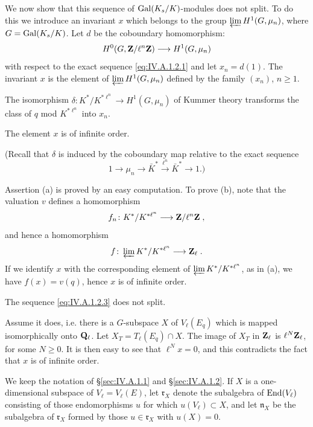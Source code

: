 We now show that this sequence of $\mathrm{Gal}(K_s/K)$-modules does not split.
To do this we introduce an invariant $x$ which belongs to the group
$\varprojlim H^1(G,\mu_n)$, where $G=\mathrm{Gal}(K_s/K)$. Let $d$ be the
coboundary homomorphism:
\[
H^0(G,\mathbf{Z}/\ell^n\mathbf{Z}) \longrightarrow H^1(G,\mu_n)
\]
with respect to the exact sequence \eqref{eq:IV.A.1.2.1} and let
$x_n=d(1)$. The invariant $x$ is the element of
$\varprojlim H^1(G,\mu_n)$ defined by the family $(x_n)$, $n\geq 1$.

\begin{proposition}
\begin{alist}
\item The isomorphism
$\delta\colon K^*/K^{*\ell^n}\longrightarrow H^1(G,\mu_n)$ of Kummer
theory transforms the class of $q$ mod $K^{*\ell^n}$ into $x_n$.
\item The element $x$ is of infinite order.
\end{alist}
\end{proposition}

(Recall that $\delta$ is induced by the coboundary map relative to the
exact sequence
\[
1 \longrightarrow \mu_n \longrightarrow \bar{K}^*
  \xrightarrow{\ \ell^n\ } \bar{K}^* \longrightarrow 1.)
\]

Assertion (a) is proved by an easy computation. To prove (b), note that
the valuation $v$ defines a homomorphism
\[
f_n\colon K^*/K^{*\ell^n} \longrightarrow \mathbf{Z}/\ell^n\mathbf{Z}\;,
\]
and hence a homomorphism
\[
f\colon \varprojlim K^*/K^{*\ell^n} \longrightarrow \mathbf{Z}_\ell\;.
\]
If we identify $x$ with the corresponding element of
$\varprojlim K^*/K^{*\ell^n}$, as in (a), we have $f(x)=v(q)$, hence $x$
is of infinite order.

\begin{corollary}
The sequence \eqref{eq:IV.A.1.2.3} does not split.
\end{corollary}

Assume it does, i.e. there is a $G$-subspace $X$ of $V_\ell(E_q)$ which
is mapped isomorphically onto $\mathbf{Q}_\ell$. Let $X_T = T_\ell(E_q)\cap X$.
The image of $X_T$ in $\mathbf{Z}_\ell$ is $\ell^N\mathbf{Z}_\ell$, for some $N\geq 0$.
It is then easy to see that $\ell^Nx=0$, and this contradicts the fact
that $x$ is of infinite order.


We keep the notation of \S\ref{sec:IV.A.1.1} and \S\ref{sec:IV.A.1.2}.
If $X$ is a one-dimensional subspace of $V_\ell = V_\ell(E)$, let
$\mathfrak{r}_X$ denote the subalgebra of $\mathrm{End}(V_\ell)$ consisting of
those endomorphisms $u$ for which $u(V_\ell)\subset X$, and let
$\mathfrak{n}_X$ be the subalgebra of $\mathfrak{r}_X$ formed by those
$u\in\mathfrak{r}_X$ with $u(X)=0$.

